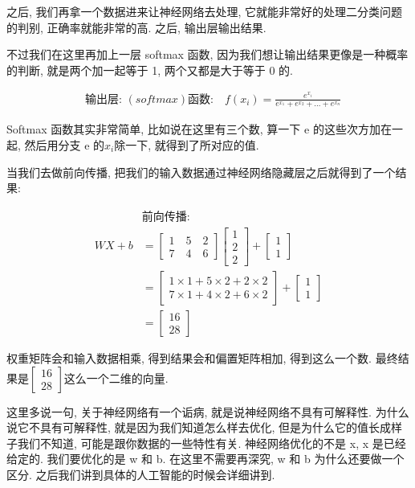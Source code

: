 之后, 我们再拿一个数据进来让神经网络去处理, 它就能非常好的处理二分类问题的判别, 正确率就能非常的高. 之后, 输出层输出结果. 

不过我们在这里再加上一层 softmax 函数, 因为我们想让输出结果更像是一种概率的判断, 就是两个加一起等于 1, 两个又都是大于等于 0 的. 

\begin{align*}
  & \mbox{输出层: }(softmax)\mbox{函数:} \quad f(x_i) = \frac{e^{x_i}}{e^{x_1}+e^{x_2}+...+e^{x_n}}
\end{align*}

Softmax 函数其实非常简单, 比如说在这里有三个数, 算一下 e 的这些次方加在一起, 然后用分支 e 的$x_i$除一下, 就得到了所对应的值. 

当我们去做前向传播, 把我们的输入数据通过神经网络隐藏层之后就得到了一个结果:

\begin{align*}
  & \mbox{前向传播: }\\
  WX + b & = \begin{bmatrix} 1 \quad 5 \quad 2 \\ 7 \quad 4 \quad 6 \end{bmatrix} \begin{bmatrix} 1 \\ 2 \\ 2 \end{bmatrix} + \begin{bmatrix} 1 \\ 1 \end{bmatrix} \\
  & = \begin{bmatrix} 1 \times 1 + 5 \times 2 + 2 \times 2 \\ 7 \times 1 + 4 \times 2 + 6 \times 2\end{bmatrix} + \begin{bmatrix} 1 \\ 1 \end{bmatrix} \\
  & = \begin{bmatrix} 16 \\ 28 \end{bmatrix}
\end{align*}

权重矩阵会和输入数据相乘, 得到结果会和偏置矩阵相加, 得到这么一个数. 最终结果是$\begin{bmatrix} 16 \\ 28 \end{bmatrix}$这么一个二维的向量. 

这里多说一句, 关于神经网络有一个诟病, 就是说神经网络不具有可解释性. 为什么说它不具有可解释性, 就是因为我们知道怎么样去优化, 但是为什么它的值长成样子我们不知道, 可能是跟你数据的一些特性有关. 神经网络优化的不是 x, x 是已经给定的. 我们要优化的是 w 和 b. 在这里不需要再深究, w 和 b 为什么还要做一个区分. 之后我们讲到具体的人工智能的时候会详细讲到. 

